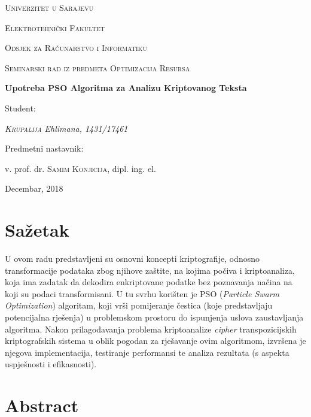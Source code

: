 \documentclass[12pt, a4paper]{article}
\begin{document}
\begin{titlepage}
	\centering
	{\scshape Univerzitet u Sarajevu \par}
	{\scshape Elektrotehnički Fakultet \par}
	{\scshape Odsjek za Računarstvo i Informatiku \par}
	\vspace{2cm}
	{\Large\scshape Seminarski rad iz predmeta Optimizacija Resursa\par}
	\vspace{2.5cm}
	{\huge\bfseries Upotreba PSO Algoritma za Analizu Kriptovanog Teksta\par}
	\vspace{2.5cm}
	\Large Student: \par
	{\Large\itshape \textsc{Krupalija} Ehlimana, 1431/17461\par}
	\vfill
	Predmetni nastavnik:\par
	v. prof. dr. \textsc{Samim Konjicija}, dipl. ing. el.
	\vfill
	{\large Decembar, 2018\par}
\end{titlepage}


\section*{Sažetak}

U ovom radu predstavljeni su osnovni koncepti kriptografije, odnosno transformacije podataka zbog njihove zaštite, na kojima počiva i kriptoanaliza, koja ima zadatak da dekodira enkriptovane podatke bez poznavanja načina na koji su podaci transformisani. U tu svrhu korišten je PSO (\textit{Particle Swarm Optimization}) algoritam, koji vrši pomijeranje čestica (koje predstavljaju potencijalna rješenja) u problemskom prostoru do ispunjenja uslova zaustavljanja algoritma. Nakon prilagođavanja problema kriptoanalize \textit{cipher} transpozicijskih kriptografskih sistema u oblik pogodan za rješavanje ovim algoritmom, izvršena je njegova implementacija, testiranje performansi te analiza rezultata (s aspekta uspješnosti i efikasnosti).

\section*{Abstract}
\end{document}
